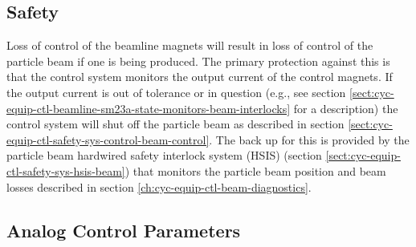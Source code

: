 \documentclass[11pt]{book}		%
\begin{document}
\subsection{Safety}\label{sect:cyc-op-interface-status-beamline-fc1totarget-safety}

Loss of control of the beamline magnets will result in loss of control of the particle beam if one is being produced.  The primary protection against this is that the control system monitors the output current of the control magnets. If the output current is out of tolerance or in question (e.g., see section \ref{sect:cyc-equip-ctl-beamline-sm23a-state-monitors-beam-interlocks} for a description) the control system will shut off the particle beam as described in section \ref{sect:cyc-equip-ctl-safety-sys-control-beam-control}.  The back up for this is provided by the particle beam hardwired safety interlock system (HSIS) (section \ref{sect:cyc-equip-ctl-safety-sys-hsis-beam}) that monitors the particle beam position and beam losses described in section \ref{ch:cyc-equip-ctl-beam-diagnostics}.


\subsection{Analog Control Parameters}\label{sect:cyc-op-interface-status-beamline-fc1totarget-analog-control}
\end{document}
